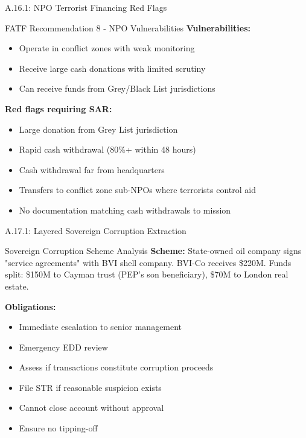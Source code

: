 \documentclass{beamer}
\begin{document}
	\begin{frame}{A.16.1: NPO Terrorist Financing Red Flags}
		\begin{block}{FATF Recommendation 8 - NPO Vulnerabilities}
			\textbf{Vulnerabilities:}
			\begin{itemize}
				\item Operate in conflict zones with weak monitoring
				\item Receive large cash donations with limited scrutiny
				\item Can receive funds from Grey/Black List jurisdictions
			\end{itemize}
			\textbf{Red flags requiring SAR:}
			\begin{itemize}
				\item Large donation from Grey List jurisdiction
				\item Rapid cash withdrawal (80\%+ within 48 hours)
				\item Cash withdrawal far from headquarters
				\item Transfers to conflict zone sub-NPOs where terrorists control aid
				\item No documentation matching cash withdrawals to mission
			\end{itemize}
		\end{block}
	\end{frame}
	
	
	\begin{frame}{A.17.1: Layered Sovereign Corruption Extraction}
		\begin{block}{Sovereign Corruption Scheme Analysis}
			\textbf{Scheme:} State-owned oil company signs "service agreements" with BVI shell company. BVI-Co receives \$220M. Funds split: \$150M to Cayman trust (PEP's son beneficiary), \$70M to London real estate.
		\end{block}
		\textbf{Obligations:}
		\begin{itemize}
			\item Immediate escalation to senior management
			\item Emergency EDD review
			\item Assess if transactions constitute corruption proceeds
			\item File STR if reasonable suspicion exists
			\item Cannot close account without approval
			\item Ensure no tipping-off
		\end{itemize}
	\end{frame}
	
\end{document}
